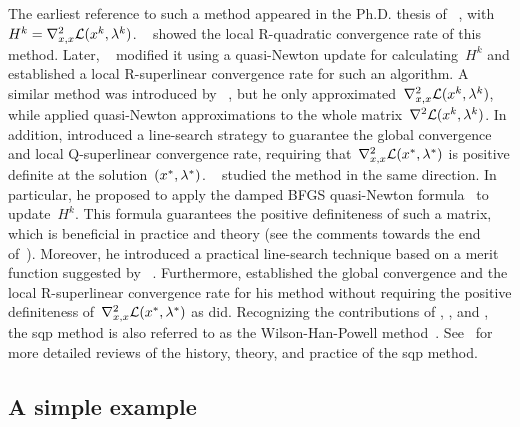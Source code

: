 The earliest reference to such a method appeared in the Ph.D. thesis of \citeauthor{Wilson_1963}~\cite{Wilson_1963}, with~$H^k = \nabla_{x, x}^2 \lag(\iter[k], \lm[k])$.
~\cite{Robinson_1974} showed the local R-quadratic convergence rate of this method.
Later, \citeauthor{Garcia-Palomares_Mangasarian_1976}~\cite{Garcia-Palomares_1973,Garcia-Palomares_Mangasarian_1976} modified it using a quasi-Newton update for calculating~$H^k$ and established a local R-superlinear convergence rate for such an algorithm.
A similar method was introduced by \citeauthor{Han_1976}~\cite{Han_1976,Han_1977}, but he only approximated~$\nabla_{x, x}^2 \lag(\iter[k], \lm[k])$, while \citeauthor{Garcia-Palomares_Mangasarian_1976} applied quasi-Newton approximations to the whole matrix~$\nabla^2 \lag(\iter[k], \lm[k])$.
In addition, \citeauthor{Han_1976} introduced a line-search strategy to guarantee the global convergence and local Q-superlinear convergence rate, requiring that~$\nabla_{x, x}^2 \lag(\iter[\ast], \lm[\ast])$ is positive definite at the solution~$(\iter[\ast], \lm[\ast])$.
~\cite{Powell_1978b,Powell_1978a,Powell_1978c} studied the method in the same direction.
In particular, he proposed to apply the damped BFGS quasi-Newton formula~\cite[Eqs.~(5.8),~(5.9), and~(5.10)]{Powell_1978b} to update~$H^k$.
This formula guarantees the positive definiteness of such a matrix, which is beneficial in practice and theory (see the comments towards the end of~\cite[\S~2]{Powell_1978a}).
Moreover, he introduced a practical line-search technique based on a merit function suggested by \citeauthor{Han_1976}~\cite{Han_1976}.
Furthermore, \citeauthor{Powell_1978c} established the global convergence and the local R-superlinear convergence rate for his method without requiring the positive definiteness of~$\nabla_{x, x}^2 \lag(\iter[\ast], \lm[\ast])$ as \citeauthor{Han_1976} did.
Recognizing the contributions of \citeauthor{Wilson_1963}, , and \citeauthor{Powell_1978a}, the \gls{sqp} method is also referred to as the Wilson-Han-Powell method~\cite{Schittkowski_1981a,Schittkowski_1981b,Burke_1992}.
See~\cite{Boggs_Tolle_1995,Gould_Toint_2000,Schittkowski_Yuan_2011,Gill_Wong_2011} for more detailed reviews of the history, theory, and practice of the \gls{sqp} method.

\subsection{A simple example}
\label{subsec:sqp-simple-example}

